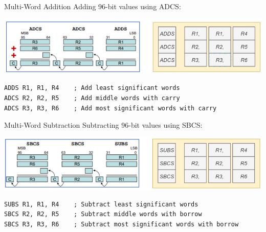 \begin{example2}{Multi-Word Addition}
Adding 96-bit values using ADCS:

\includegraphics[width=\linewidth]{images/multiwordadd.png}

\begin{lstlisting}[language=armasm, style=basesmol]
ADDS R1, R1, R4    ; Add least significant words
ADCS R2, R2, R5    ; Add middle words with carry
ADCS R3, R3, R6    ; Add most significant words with carry
\end{lstlisting}
\end{example2}

\begin{example2}{Multi-Word Subtraction}
Subtracting 96-bit values using SBCS:

\includegraphics[width=\linewidth]{images/multiwordsub.png}

\begin{lstlisting}[language=armasm, style=basesmol]
SUBS R1, R1, R4    ; Subtract least significant words
SBCS R2, R2, R5    ; Subtract middle words with borrow
SBCS R3, R3, R6    ; Subtract most significant words with borrow
\end{lstlisting}
\end{example2}

